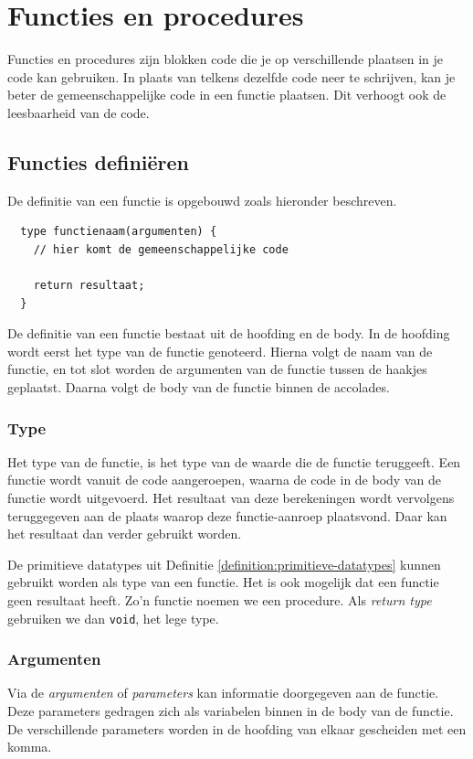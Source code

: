 \documentclass[11pt,fleqn]{book} %
\begin{document}
\chapter{Functies en procedures}
Functies en procedures zijn blokken code die je op verschillende plaatsen in je code kan gebruiken. In plaats van telkens dezelfde code neer te schrijven, kan je beter de gemeenschappelijke code in een functie plaatsen. Dit verhoogt ook de leesbaarheid van de code.

\section{Functies definiëren}
De definitie van een functie is opgebouwd zoals hieronder beschreven.
\begin{definition}[Functie]
	\phantom{ }
	\begin{verbatim}
  type functienaam(argumenten) {
    // hier komt de gemeenschappelijke code
    
    return resultaat;
  }
	\end{verbatim}
	\vspace{0cm}
\end{definition}
\noindent
De definitie van een functie bestaat uit de hoofding en de body. In de hoofding wordt eerst het type van de functie genoteerd. Hierna volgt de naam van de functie, en tot slot worden de argumenten van de functie tussen de haakjes geplaatst. Daarna volgt de body van de functie binnen de accolades.

\subsection{Type}
Het type van de functie, is het type van de waarde die de functie teruggeeft. Een functie wordt vanuit de code aangeroepen, waarna de code in de body van de functie wordt uitgevoerd. Het resultaat van deze berekeningen wordt vervolgens teruggegeven aan de plaats waarop deze functie-aanroep plaatsvond. Daar kan het resultaat dan verder gebruikt worden.

De primitieve datatypes uit Definitie \ref{definition:primitieve-datatypes} kunnen gebruikt worden als type van een functie. Het is ook mogelijk dat een functie geen resultaat heeft. Zo'n functie noemen we een procedure. Als \emph{return type} gebruiken we dan \texttt{void}, het lege type.


\subsection{Argumenten}
Via de \emph{argumenten} of \emph{parameters} kan informatie doorgegeven aan de functie. Deze parameters gedragen zich als variabelen binnen in de body van de functie. De verschillende parameters worden in de hoofding van elkaar gescheiden met een komma.
\end{document}
